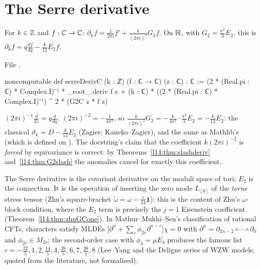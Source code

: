 \section{The Serre derivative}\label{l14:sec:serre}

\begin{definition}\label{l14:def:serre}
For $k\in{\mathbb{Z}}$ and $f:{\mathbb{C}}\to{\mathbb{C}}$: $\partial_kf = \frac{1}{2\pi i}f' + \frac{k}{(2\pi i)^2}G_2f$. On $\mathbb{H}$, with
$G_2 = \frac{\pi^2}3E_2$, this is $\partial_kf = q\frac{df}{dq} - \frac{k}{12}E_2f$.
\end{definition}
\noindent File .
\begin{leancode}
noncomputable def serreDerivC (k : ℤ) (f : ℂ → ℂ) (z : ℂ) : ℂ :=
  (2 * (Real.pi : ℂ) * Complex.I)⁻¹ * _root_.deriv f z
    + (k : ℂ) * ((2 * (Real.pi : ℂ) * Complex.I)⁻¹) ^ 2 * (G2C z * f z)
\end{leancode}
\begin{dictionary}
$(2\pi i)^{-1}\frac{d}{dz} = q\frac{d}{dq}$. $(2\pi i)^{-2} = -\frac1{4\pi^2}$, so $\frac{k}{(2\pi i)^2}G_2 = -\frac{k}{4\pi^2}\cdot
\frac{\pi^2}{3}E_2 = -\frac k{12}E_2$: the classical $\vartheta_k = D - \frac k{12}E_2$ (Zagier; Kaneko--Zagier), and the same
as Mathlib's  (which is defined on ). The docstring's claim that the coefficient
$k(2\pi i)^{-2}$ is \emph{forced} by equivariance is correct: by Theorems~\ref{l14:thm:slashderiv} and~\ref{l14:thm:G2slash}
the anomalies cancel for exactly this coefficient.
\end{dictionary}
\begin{physics}
The Serre derivative is the covariant derivative on the moduli space of tori; $E_2$ is the connection. It is the operation of
inserting the zero mode $L_{[0]}$ of the \emph{torus} stress tensor (Zhu's square-bracket $\tilde\omega = \omega -
\frac c{24}\mathbf 1$): this is the content of Zhu's $\omega$-block condition, where the $E_2$ term is precisely the $j=1$
Eisenstein coefficient (Theorem~\ref{l14:thm:zhuGCone}). In Mathur--Mukhi--Sen's classification of rational CFTs, characters
satisfy MLDEs $\bigl[\partial^n + \sum_r\phi_{2r}\partial^{n-r}\bigr]\chi = 0$ with $\partial^n = \partial_{2n-2}\circ\cdots
\circ\partial_0$ and $\phi_{2r}\in M_{2r}$; the second-order case with $\phi_4 = \mu E_4$ produces the famous list
$c = -\frac{22}5,1,2,\frac{14}5,4,\frac{26}5,6,7,\frac{38}5,8$ (Lee--Yang and the Deligne series of WZW models; quoted from
the literature, not formalised).
\end{physics}

